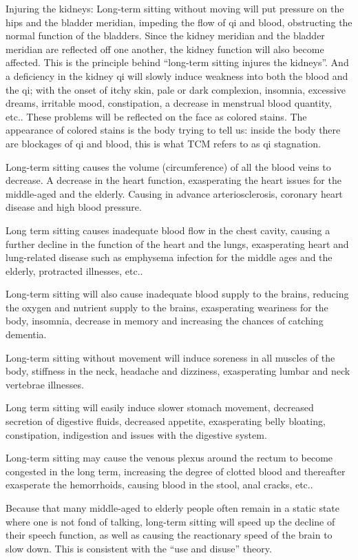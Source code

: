 \documentclass[
]{book}
\begin{document}
Injuring the kidneys: Long-term sitting without moving will put pressure on the hips and the bladder meridian, impeding the flow of qi and blood, obstructing the normal function of the bladders. Since the kidney meridian and the bladder meridian are reflected off one another, the kidney function will also become affected. This is the principle behind ``long-term sitting injures the kidneys''. And a deficiency in the kidney qi will slowly induce weakness into both the blood and the qi; with the onset of itchy skin, pale or dark complexion, insomnia, excessive dreams, irritable mood, constipation, a decrease in menstrual blood quantity, etc.. These problems will be reflected on the face as colored stains. The appearance of colored stains is the body trying to tell us: inside the body there are blockages of qi and blood, this is what TCM refers to as qi stagnation.

Long-term sitting causes the volume (circumference) of all the blood veins to decrease. A decrease in the heart function, exasperating the heart issues for the middle-aged and the elderly. Causing in advance arteriosclerosis, coronary heart disease and high blood pressure.

Long term sitting causes inadequate blood flow in the chest cavity, causing a further decline in the function of the heart and the lungs, exasperating heart and lung-related disease such as emphysema infection for the middle ages and the elderly, protracted illnesses, etc..

Long-term sitting will also cause inadequate blood supply to the brains, reducing the oxygen and nutrient supply to the brains, exasperating weariness for the body, insomnia, decrease in memory and increasing the chances of catching dementia.

Long-term sitting without movement will induce soreness in all muscles of the body, stiffness in the neck, headache and dizziness, exasperating lumbar and neck vertebrae illnesses.

Long term sitting will easily induce slower stomach movement, decreased secretion of digestive fluids, decreased appetite, exasperating belly bloating, constipation, indigestion and issues with the digestive system.

Long-term sitting may cause the venous plexus around the rectum to become congested in the long term, increasing the degree of clotted blood and thereafter exasperate the hemorrhoids, causing blood in the stool, anal cracks, etc..

Because that many middle-aged to elderly people often remain in a static state where one is not fond of talking, long-term sitting will speed up the decline of their speech function, as well as causing the reactionary speed of the brain to slow down. This is consistent with the ``use and disuse'' theory.
\end{document}
